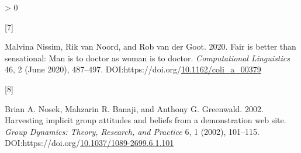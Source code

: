 \documentclass[
  10pt,
  dvipsnames,enabledeprecatedfontcommands, twocolumn]{scrartcl}
\newlength{\cslhangindent}
\newlength{\csllabelwidth}
\newenvironment{CSLReferences}[2] %
 {%
  \setlength{\parindent}{0pt}
  \ifodd #1 \everypar{\setlength{\hangindent}{\cslhangindent}}\ignorespaces\fi
  \ifnum #2 > 0
  \setlength{\parskip}{#2\baselineskip}
  \fi
 }%
 {}
\newcommand{\CSLLeftMargin}[1]{\parbox[t]{\csllabelwidth}{#1}}
\newcommand{\CSLRightInline}[1]{\parbox[t]{\linewidth - \csllabelwidth}{#1}\break}
\begin{document}
\begin{CSLReferences}{0}{0}
\leavevmode\hypertarget{ref-Nissim2020fair}{}%
\CSLLeftMargin{{[}7{]} }
\CSLRightInline{Malvina Nissim, Rik van Noord, and Rob van der Goot.
2020. Fair is better than sensational: Man is to doctor as woman is to
doctor. \emph{Computational Linguistics} 46, 2 (June 2020), 487--497.
DOI:https://doi.org/\href{https://doi.org/10.1162/coli_a_00379}{10.1162/coli\_a\_00379}}

\leavevmode\hypertarget{ref-Nosek2002harvesting}{}%
\CSLLeftMargin{{[}8{]} }
\CSLRightInline{Brian A. Nosek, Mahzarin R. Banaji, and Anthony G.
Greenwald. 2002. Harvesting implicit group attitudes and beliefs from a
demonstration web site. \emph{Group Dynamics: Theory, Research, and
Practice} 6, 1 (2002), 101--115.
DOI:https://doi.org/\href{https://doi.org/10.1037/1089-2699.6.1.101}{10.1037/1089-2699.6.1.101}}

\end{CSLReferences}
\end{document}
